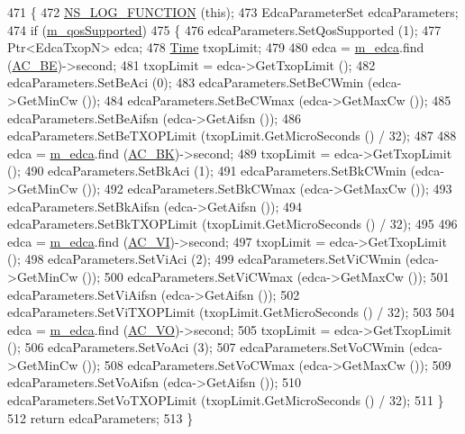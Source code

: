 \begin{DoxyCode}
471 \{
472   \hyperlink{log-macros-disabled_8h_a90b90d5bad1f39cb1b64923ea94c0761}{NS\_LOG\_FUNCTION} (\textcolor{keyword}{this});
473   EdcaParameterSet edcaParameters;
474   \textcolor{keywordflow}{if} (\hyperlink{classns3_1_1RegularWifiMac_aeecdb918687493a8efdd70304bc0cee9}{m\_qosSupported})
475     \{
476       edcaParameters.SetQosSupported (1);
477       Ptr<EdcaTxopN> edca;
478       \hyperlink{namespacens3_1_1TracedValueCallback_a7ffd3e7c142ffe7c8a1d2db9b8de38ec}{Time} txopLimit;
479 
480       edca = \hyperlink{classns3_1_1RegularWifiMac_ac750365ab3708902cc0b7700164c706d}{m\_edca}.find (\hyperlink{group__wifi_ggab422b4562ba272b39a9b6bca3513f3aca136016fc12611734060b599355503c29}{AC\_BE})->second;
481       txopLimit = edca->GetTxopLimit ();
482       edcaParameters.SetBeAci (0);
483       edcaParameters.SetBeCWmin (edca->GetMinCw ());
484       edcaParameters.SetBeCWmax (edca->GetMaxCw ());
485       edcaParameters.SetBeAifsn (edca->GetAifsn ());
486       edcaParameters.SetBeTXOPLimit (txopLimit.GetMicroSeconds () / 32);
487 
488       edca = \hyperlink{classns3_1_1RegularWifiMac_ac750365ab3708902cc0b7700164c706d}{m\_edca}.find (\hyperlink{group__wifi_ggab422b4562ba272b39a9b6bca3513f3aca53e99420c645076e74307112d73eb38b}{AC\_BK})->second;
489       txopLimit = edca->GetTxopLimit ();
490       edcaParameters.SetBkAci (1);
491       edcaParameters.SetBkCWmin (edca->GetMinCw ());
492       edcaParameters.SetBkCWmax (edca->GetMaxCw ());
493       edcaParameters.SetBkAifsn (edca->GetAifsn ());
494       edcaParameters.SetBkTXOPLimit (txopLimit.GetMicroSeconds () / 32);
495 
496       edca = \hyperlink{classns3_1_1RegularWifiMac_ac750365ab3708902cc0b7700164c706d}{m\_edca}.find (\hyperlink{group__wifi_ggab422b4562ba272b39a9b6bca3513f3aca1c60bd99c5ede59bb50b91182cb81d0f}{AC\_VI})->second;
497       txopLimit = edca->GetTxopLimit ();
498       edcaParameters.SetViAci (2);
499       edcaParameters.SetViCWmin (edca->GetMinCw ());
500       edcaParameters.SetViCWmax (edca->GetMaxCw ());
501       edcaParameters.SetViAifsn (edca->GetAifsn ());
502       edcaParameters.SetViTXOPLimit (txopLimit.GetMicroSeconds () / 32);
503 
504       edca = \hyperlink{classns3_1_1RegularWifiMac_ac750365ab3708902cc0b7700164c706d}{m\_edca}.find (\hyperlink{group__wifi_ggab422b4562ba272b39a9b6bca3513f3aca147b7f007ca5459e52ee93d1ebe83639}{AC\_VO})->second;
505       txopLimit = edca->GetTxopLimit ();
506       edcaParameters.SetVoAci (3);
507       edcaParameters.SetVoCWmin (edca->GetMinCw ());
508       edcaParameters.SetVoCWmax (edca->GetMaxCw ());
509       edcaParameters.SetVoAifsn (edca->GetAifsn ());
510       edcaParameters.SetVoTXOPLimit (txopLimit.GetMicroSeconds () / 32);
511     \}
512   \textcolor{keywordflow}{return} edcaParameters;
513 \}
\end{DoxyCode}


